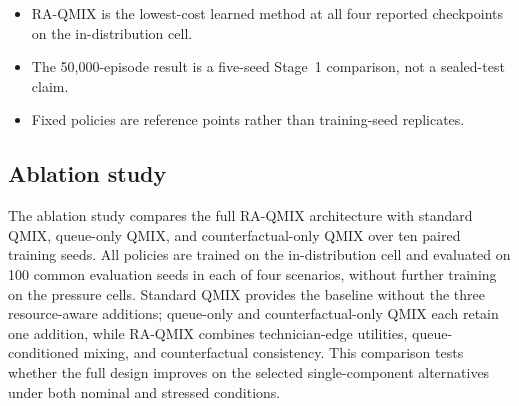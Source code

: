 \documentclass[11pt]{article}
\begin{document}
\begin{itemize}[leftmargin=*]
    \item RA-QMIX is the lowest-cost learned method at all four reported checkpoints on the in-distribution cell.
    \item The 50,000-episode result is a five-seed Stage~1 comparison, not a sealed-test claim.
    \item Fixed policies are reference points rather than training-seed replicates.
\end{itemize}

\subsection{Ablation study}
\label{sec:ablation-results}

The ablation study compares the full RA-QMIX architecture with standard QMIX, queue-only QMIX, and counterfactual-only QMIX over ten paired training seeds. All policies are trained on the in-distribution cell and evaluated on 100 common evaluation seeds in each of four scenarios, without further training on the pressure cells. Standard QMIX provides the baseline without the three resource-aware additions; queue-only and counterfactual-only QMIX each retain one addition, while RA-QMIX combines technician-edge utilities, queue-conditioned mixing, and counterfactual consistency. This comparison tests whether the full design improves on the selected single-component alternatives under both nominal and stressed conditions.
\end{document}
